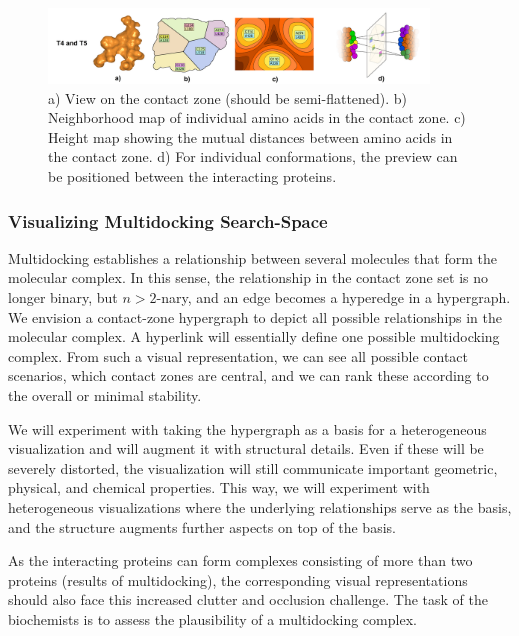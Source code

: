 \documentclass[11pt,a4paper,titlepage,oneside,onecolumn]{article}
\begin{document}
\begin{figure}[ht]
\centering
\includegraphics[width=0.9\textwidth]{pics/preview.png}
\caption{a) View on the contact zone (should be semi-flattened). b) Neighborhood map of individual amino acids in the contact zone. c) Height map showing the mutual distances between amino acids in the contact zone. d) For individual conformations, the preview can be positioned between the interacting proteins.}
\label{fig:preview}
\end{figure}

\subsubsection{Visualizing Multidocking Search-Space}
Multidocking establishes a relationship between several molecules that form the molecular complex. 
In this sense, the relationship in the contact zone set is no longer binary, but $n>2$-nary, and an edge becomes a hyperedge in a hypergraph. 
We envision a contact-zone hypergraph to depict all possible relationships in the molecular complex. 
A hyperlink will essentially define one possible multidocking complex. 
From such a visual representation, we can see all possible contact scenarios, which contact zones are central, and we can rank these according to the overall or minimal stability.

We will experiment with taking the hypergraph as a basis for a heterogeneous visualization and will augment it with structural details.
Even if these will be severely distorted, the visualization will still communicate important geometric, physical, and chemical properties. 
This way, we will experiment with heterogeneous visualizations where the underlying relationships serve as the basis, and the structure augments further aspects on top of the basis.

As the interacting proteins can form complexes consisting of more than two proteins (results of multidocking), the corresponding visual representations should also face this increased clutter and occlusion challenge.
The task of the biochemists is to assess the plausibility of a multidocking complex.%

\end{document}

